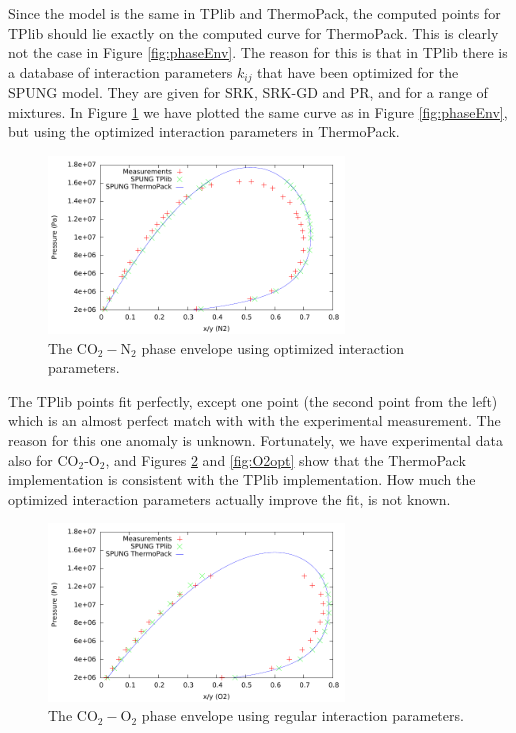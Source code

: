 \documentclass[internal,english]{sintefmemo2012}
\numberwithin{equation}{section}
\begin{document}
Since the model is the same in TPlib and ThermoPack, the computed
points for TPlib should lie exactly on the computed curve for
ThermoPack. This is clearly not the case in Figure
\ref{fig:phaseEnv}. The reason for this is that in TPlib there is a database of interaction
parameters $k_{ij}$ that have been optimized for the SPUNG model. They
are given for SRK, SRK-GD and PR, and for a range of mixtures. In
Figure \ref{fig:phaseEnv_opt} we have plotted the same curve as in
Figure \ref{fig:phaseEnv}, but using the optimized interaction
parameters in ThermoPack.
\begin{figure}[h]
  \centering
  \includegraphics[width=0.7\textwidth]{figures/phaseEnvelope_optimized.pdf}
  \caption{The $\mathrm{CO}_2-\mathrm N_2$ phase envelope using
    optimized interaction parameters.}
  \label{fig:phaseEnv_opt}
\end{figure}
The TPlib points fit perfectly, except one point (the second point
from the left) which is an almost perfect match with with the
experimental measurement. The reason for this one anomaly is
unknown. Fortunately, we have experimental data also for CO$_2$-O$_2$,
and Figures \ref{fig:O2reg} and \ref{fig:O2opt} show that the
ThermoPack implementation is consistent with the TPlib
implementation. How much the optimized interaction parameters actually
improve the fit, is not known.

\begin{figure}[h]
  \centering
  \includegraphics[width=0.7\textwidth]{figures/phaseEnvelope_O2_regular.pdf}
  \caption{The $\mathrm{CO}_2-\mathrm O_2$ phase envelope using
    regular interaction parameters.}
  \label{fig:O2reg}
\end{figure}
\end{document}
